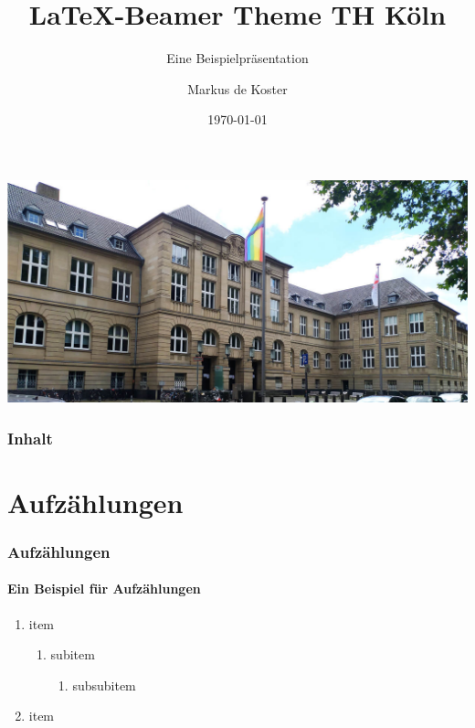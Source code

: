 \documentclass{beamer}
\title{\LaTeX -Beamer Theme TH Köln}
\subtitle[Beispielpräsi]{Eine Beispielpräsentation}
\institute[TH Köln]{Technische Hochschule Köln}
\date[\ddmmyyyydate\today]{\today} %
\author{Markus de Koster}
\begin{document}
\begin{frame}
    \vspace{2em} %
    \includegraphics[width=\textwidth]{figures/thk.jpg}
    \titlepage
\end{frame}

\begin{frame}
    \frametitle{Inhalt}
    \tableofcontents
\end{frame}

\section{Aufzählungen}\label{sec:enumerations} %
\begin{frame} 
    \frametitle{Aufzählungen} 
    \framesubtitle{Ein Beispiel für Aufzählungen} 
    \begin{enumerate} 
        \item item 
        \begin{enumerate} 
            \item subitem
            \begin{enumerate} 
                \item subsubitem
            \end{enumerate}
        \end{enumerate}
        \item item
    \end{enumerate}
\end{frame}
\end{document}
